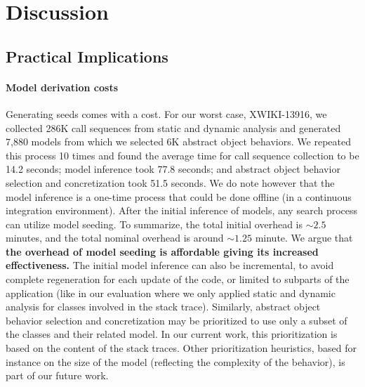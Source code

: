 

\section{Discussion}\label{sec:model_seeding:discussion}

\subsection{Practical Implications}

\paragraph{Model derivation costs} Generating seeds comes with a cost. %
%
For our worst case, XWIKI-13916, we collected 286K call sequences from static and dynamic analysis and generated 7,880 models from which we selected 6K abstract object behaviors. We repeated this process 10 times and found the average time for call sequence collection to be 14.2 seconds; model inference took 77.8 seconds; and abstract object behavior selection and concretization took 51.5 seconds. We do note however that the model inference is a one-time process that could be done offline (in a continuous integration environment). After the initial inference of models, any search process can utilize model seeding. To summarize, the total initial overhead is $\sim2.5$ minutes, and the total nominal overhead is around $\sim1.25$ minute.
%
We argue that \textbf{the overhead of model seeding is affordable giving its increased effectiveness. }
%
The initial model inference can also be incremental, to avoid complete regeneration for each update of the code, or limited to subparts of the application (like in our evaluation where we only applied static and dynamic analysis for classes involved in the stack trace).
%
Similarly, abstract object behavior selection and concretization may be prioritized to use only a subset of the classes and their related model. In our current work, this prioritization is based on the content of the stack traces. Other prioritization heuristics, based for instance on the size of the model (reflecting the complexity of the behavior), is part of our future work.


